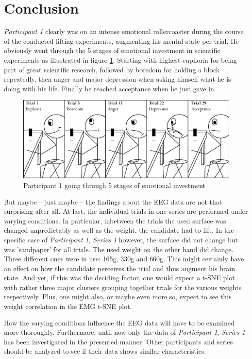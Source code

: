 \documentclass{article} %
\begin{document}
\section{Conclusion}
\emph{Participant 1} clearly was on an intense emotional rollercoaster during the course of the conducted lifting experiments, augmenting his mental state per trial. He obviously went through the 5 stages of emotional investment in scientific experiments as illustrated in figure \ref{fig:stickman}: Starting with highest euphoria for being part of great scientific research, followed by boredom for holding a block repeatedly, then anger and major depression when asking himself what he is doing with his life. Finally he reached acceptance when he just gave in.

\begin{figure}[h]
	\centering
	\includegraphics[width=1.0\textwidth]{stickman.pdf}
	\caption{Participant 1 going through 5 stages of emotional investment}
	\label{fig:stickman}
\end{figure}

But maybe -- just maybe -- the findings about the EEG data are not that surprising after all. At last, the individual trials in one series are performed under varying conditions. In particular, inbetween the trials the used surface was changed unpredictably as well as the weight, the candidate had to lift. In the specific case of \emph{Participant 1}, \emph{Series 1} however, the surface did not change but was 'sandpaper' for all trials. The used weight on the other hand did change. Three different ones were in use: 165g, 330g and 660g. This might certainly have an effect on how the candidate perceives the trial and thus augment his brain state. And yet, if this was the deciding factor, one would expect a t-SNE plot with rather three major clusters grouping together trials for the various weights respectively. Plus, one might also, or maybe even more so, expect to see this weight correlation in the EMG t-SNE plot.

How the varying conditions influence the EEG data will have to be examined more thoroughly. Furthermore, until now only the data of \emph{Participant 1}, \emph{Series 1} has been investigated in the presented manner. Other participants and series should be analyzed to see if their data shows similar characteristics.
\end{document}
